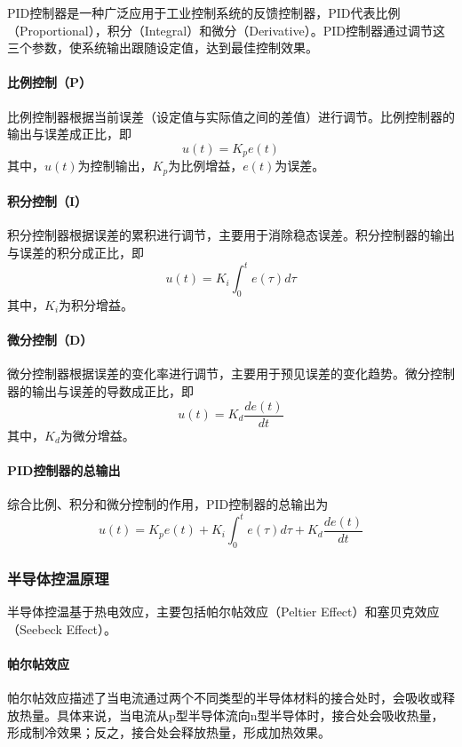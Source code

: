 \documentclass[dvipsnames, svgnames,a4paper,11pt]{article}
\begin{document}
PID控制器是一种广泛应用于工业控制系统的反馈控制器，PID代表比例（Proportional），积分（Integral）和微分（Derivative）。PID控制器通过调节这三个参数，使系统输出跟随设定值，达到最佳控制效果。

\paragraph{比例控制（P）}

比例控制器根据当前误差（设定值与实际值之间的差值）进行调节。比例控制器的输出与误差成正比，即
\[ u(t) = K_p e(t) \]
其中，$u(t)$为控制输出，$K_p$为比例增益，$e(t)$为误差。

\paragraph{积分控制（I）}

积分控制器根据误差的累积进行调节，主要用于消除稳态误差。积分控制器的输出与误差的积分成正比，即
\[ u(t) = K_i \int_0^t e(\tau) d\tau \]
其中，$K_i$为积分增益。

\paragraph{微分控制（D）}

微分控制器根据误差的变化率进行调节，主要用于预见误差的变化趋势。微分控制器的输出与误差的导数成正比，即
\[ u(t) = K_d \frac{de(t)}{dt} \]
其中，$K_d$为微分增益。

\paragraph{PID控制器的总输出}

综合比例、积分和微分控制的作用，PID控制器的总输出为
\[ u(t) = K_p e(t) + K_i \int_0^t e(\tau) d\tau + K_d \frac{de(t)}{dt} \]

\subsubsection{半导体控温原理}

半导体控温基于热电效应，主要包括帕尔帖效应（Peltier Effect）和塞贝克效应（Seebeck Effect）。

\paragraph*{帕尔帖效应}

帕尔帖效应描述了当电流通过两个不同类型的半导体材料的接合处时，会吸收或释放热量。具体来说，当电流从p型半导体流向n型半导体时，接合处会吸收热量，形成制冷效果；反之，接合处会释放热量，形成加热效果。
\end{document}
